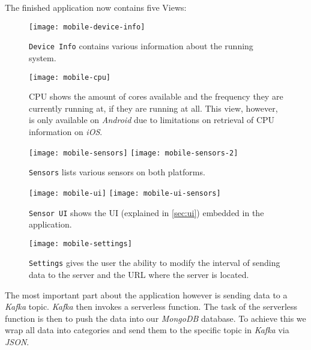 The finished application now contains five Views:

\begin{figure}[H]
  \centering
  \texttt{[image: mobile-device-info]}
  \caption{\texttt{Device Info} contains various information about the running system.}
\end{figure}

\begin{figure}[H]
  \centering
  \texttt{[image: mobile-cpu]}
  \caption{CPU shows the amount of cores available and the frequency they are currently
  running at, if they are running at all. This view, however, is only available on \textit{Android}
  due to limitations on retrieval of CPU information on \textit{iOS}.}
\end{figure}

\begin{figure}[H]
  \centering
  \texttt{[image: mobile-sensors]}
  \texttt{[image: mobile-sensors-2]}
  \caption{\texttt{Sensors} lists various sensors on both platforms.}
\end{figure}

\begin{figure}[H]
  \centering
  \texttt{[image: mobile-ui]}
  \texttt{[image: mobile-ui-sensors]}
  \caption{\texttt{Sensor UI} shows the UI (explained in \autoref{sec:ui}) embedded in the application.}
\end{figure}

\begin{figure}[H]
  \centering
  \texttt{[image: mobile-settings]}
  \caption{\texttt{Settings} gives the user the ability to modify the interval of sending data to the
  server and the URL where the server is located.}
\end{figure}

The most important part about the application however is sending data to a \textit{Kafka} topic.
\textit{Kafka} then invokes a serverless function. The task of the serverless function is then to
push the data into our \textit{MongoDB} database. To achieve this we wrap all data into categories
and send them to the specific topic in \textit{Kafka} via \textit{JSON}.
